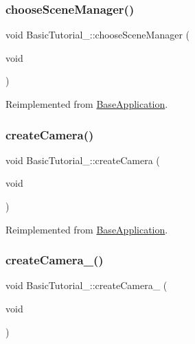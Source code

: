 \subsubsection{\texorpdfstring{choose\+Scene\+Manager()}{chooseSceneManager()}}
{\footnotesize\ttfamily void Basic\+Tutorial\+\_\+::choose\+Scene\+Manager (\begin{DoxyParamCaption}\item[{void}]{ }\end{DoxyParamCaption})\hspace{0.3cm}{\ttfamily [virtual]}}



Reimplemented from \mbox{\hyperlink{class_base_application_ad5bc9655041e1849a4c13f444a3712bd}{Base\+Application}}.

\mbox{\label{class_basic_tutorial__00_a1bf709417d654dffc2ea10987412b912}} 
\subsubsection{\texorpdfstring{create\+Camera()}{createCamera()}}
{\footnotesize\ttfamily void Basic\+Tutorial\+\_\+::create\+Camera (\begin{DoxyParamCaption}\item[{void}]{ }\end{DoxyParamCaption})\hspace{0.3cm}{\ttfamily [virtual]}}



Reimplemented from \mbox{\hyperlink{class_base_application_afa9d51527763cf9aee9cd4e1b1039d55}{Base\+Application}}.

\mbox{\label{class_basic_tutorial__00_a3479c50dbf8dc06a7ea77014eb94c6e7}} 
\subsubsection{\texorpdfstring{create\+Camera\+\_()}{createCamera\_00()}}
{\footnotesize\ttfamily void Basic\+Tutorial\+\_\+::create\+Camera\+\_ (\begin{DoxyParamCaption}\item[{void}]{ }\end{DoxyParamCaption})\hspace{0.3cm}{\ttfamily [protected]}}



